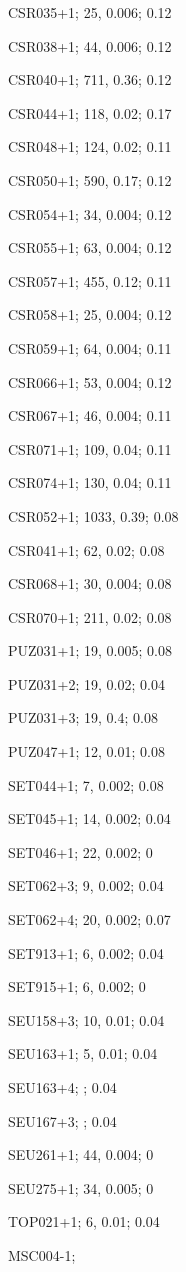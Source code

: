 CSR035+1; 25, 0.006; 0.12

CSR038+1; 44, 0.006; 0.12

CSR040+1; 711, 0.36; 0.12

CSR044+1; 118, 0.02; 0.17

CSR048+1; 124, 0.02; 0.11

CSR050+1; 590, 0.17; 0.12

CSR054+1; 34, 0.004; 0.12

CSR055+1; 63, 0.004; 0.12

CSR057+1; 455, 0.12; 0.11

CSR058+1; 25, 0.004; 0.12

CSR059+1; 64, 0.004; 0.11

CSR066+1; 53, 0.004; 0.12

CSR067+1; 46, 0.004; 0.11


CSR071+1; 109, 0.04; 0.11

CSR074+1; 130, 0.04; 0.11

CSR052+1; 1033, 0.39; 0.08

CSR041+1; 62, 0.02; 0.08

CSR068+1; 30, 0.004; 0.08

CSR070+1; 211, 0.02; 0.08

PUZ031+1; 19, 0.005; 0.08

PUZ031+2; 19, 0.02; 0.04

PUZ031+3; 19, 0.4; 0.08

PUZ047+1; 12, 0.01; 0.08

SET044+1; 7, 0.002; 0.08

SET045+1; 14, 0.002; 0.04

SET046+1; 22, 0.002; 0

SET062+3; 9, 0.002; 0.04

SET062+4; 20, 0.002; 0.07

SET913+1; 6, 0.002; 0.04

SET915+1; 6, 0.002; 0

SEU158+3; 10, 0.01; 0.04

SEU163+1; 5, 0.01; 0.04

SEU163+4; ; 0.04

SEU167+3; ; 0.04

SEU261+1; 44, 0.004; 0

SEU275+1; 34, 0.005; 0

TOP021+1; 6, 0.01; 0.04

MSC004-1;

